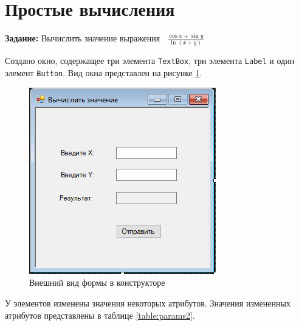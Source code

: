 \section{Простые вычисления}

\textbf{Задание:} Вычислить значение выражения ~$\displaystyle \frac{\cos{x} + \sin{y}}{\ln(x + y)}$
\vspace{0.25cm}

Создано окно, содержащее три элемента \verb|TextBox|, три элемента \verb|Label| и 
один элемент \verb|Button|. Вид окна представлен на рисунке \ref{fig:form2}.

\begin{figure}[H]
    \centering
    \includegraphics{task2/form.png}
    \caption{Внешний вид формы в конструкторе}
    \label{fig:form2}
\end{figure}

У элементов изменены значения некоторых атрибутов. 
Значения измененных атрибутов представлены в таблице \ref{table:params2}.

